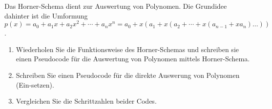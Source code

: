 
\begin{exercise}

Das Horner-Schema dient zur Auswertung von Polynomen.
Die Grundidee dahinter ist die Umformung $p(x) = a_0 + a_1 x + a_2 x^2 + \cdots + a_n x^n = a_0 + x (a_1 + x (a_2 + \cdots + x (a_{n - 1} + x a_n) \ldots))$.

\begin{enumerate}[label = (\roman*)]
    \item Wiederholen Sie die Funktionsweise des Horner-Schemas und schreiben sie einen Pseudocode für die Auswertung von Polynomen mittels Horner-Schema.
    \item Schreiben Sie einen Pseudocode für die direkte Auswerung von Polynomen (Ein-setzen).
    \item Vergleichen Sie die Schrittzahlen beider Codes.
\end{enumerate}

\end{exercise}


